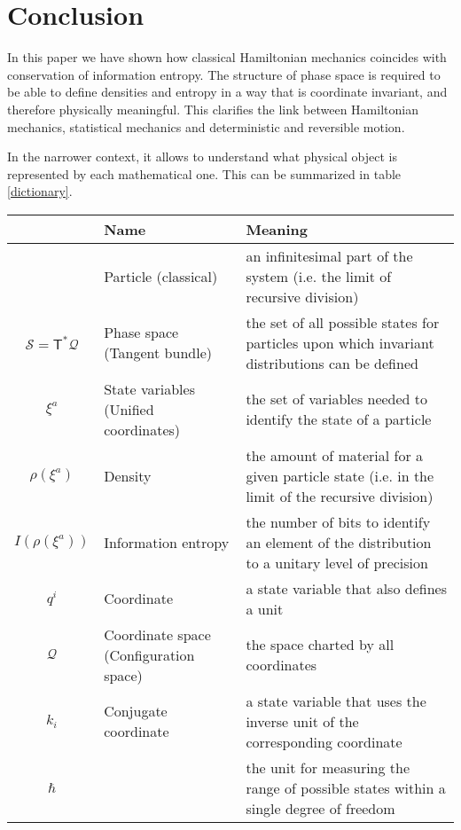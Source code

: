 \documentclass[11pt]{article}
\begin{document}
\section{Conclusion}

In this paper we have shown how classical Hamiltonian mechanics coincides with conservation of information entropy. The structure of phase space is required to be able to define densities and entropy in a way that is coordinate invariant, and therefore physically meaningful. This clarifies the link between Hamiltonian mechanics, statistical mechanics and deterministic and reversible motion.

In the narrower context, it allows to understand what physical object is represented by each mathematical one. This can be summarized in table \ref{dictionary}.
\begin{table}[h]
	\centering
	\begin{tabular}{c p{} p{} }
		& Name & Meaning\\ 
		\hline 
		& Particle (classical) & an infinitesimal part of the system (i.e. the limit of recursive division) \\ 
		$\mathcal{S} =\mathsf{T}^*\mathcal{Q}$ & Phase space \newline (Tangent bundle) & the set of all possible states for particles upon which invariant distributions can be defined \\
		$\xi^a$ & State variables \newline (Unified coordinates) & the set of variables needed to identify the state of a particle \\ 
		$\rho(\xi^a)$ & Density & the amount of material for a given particle state (i.e. in the limit of the recursive division)\\ 
		$I(\rho(\xi^a))$ & Information entropy & the number of bits to identify an element of the distribution to a unitary level of precision\\ 
		$q^i$ & Coordinate & a state variable that also defines a unit \\
		$\mathcal{Q}$ & Coordinate space \newline (Configuration space) & the space charted by all coordinates \\
		$k_i$ & Conjugate coordinate & a state variable that uses the inverse unit of the corresponding coordinate \\
		$\hbar$ & & the unit for measuring the range of possible states within a single degree of freedom \\

\end{tabular}
\end{table}
\end{document}
